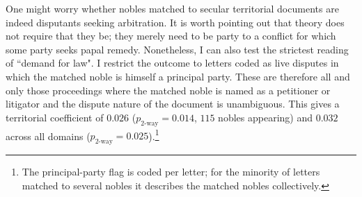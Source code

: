 \documentclass[12pt]{article}
\theoremstyle{definition}
\theoremstyle{remark}
\begin{document}
One might worry whether nobles matched to secular territorial documents are indeed disputants seeking arbitration. It is worth pointing out that theory does not require that they be; they merely need to be party to a conflict for which some party seeks papal remedy. Nonetheless, I can also test the strictest reading of ``demand for law". I restrict the outcome to letters coded as live disputes in which the matched noble is himself a principal party. These are therefore all and only those proceedings where the matched noble is named as a petitioner or litigator and the dispute nature of the document is unambiguous. This gives a territorial coefficient of $0.026$ ($p_{\text{2-way}}=0.014$, $115$ nobles appearing) and $0.032$ across all domains ($p_{\text{2-way}}=0.025$).\footnote{The principal-party flag is coded per letter; for the minority of letters matched to several nobles it describes the matched nobles collectively.}
\end{document}
